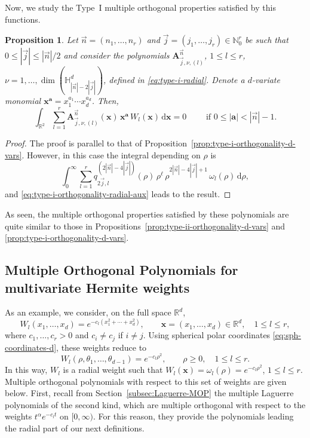 \documentclass[a4paper]{article}
\theoremstyle{plain}
\newtheorem{proposition}[theorem]{Proposition}
\theoremstyle{definition}
\newcommand{\NN}{\mathbb{N}}
\newcommand{\RR}{\mathbb{R}}
\newcommand{\dr}{\mathrm{d}}
\begin{document}
    Now, we study the Type~I multiple orthogonal properties satisfied by this functions.

    \begin{proposition} Let $\vec n = (n_1,\dots,n_r)$ and $\vec j = (j_1,\dots,j_r)\in\NN_0^r$ be such that  $0\leq |\vec j| \leq |\vec n|/2$ and consider the polynomials $\mathbf A_{\vec j,\nu,(l)}^{\vec n}$, $1\leq l\leq r$, $\nu=1,\dots,\dim(\mathbb H_{|\vec n|-2|\vec j|}^d)$, defined in \eqref{eq:type-i-radial}. Denote a $d$-variate monomial $\mathbf x^{\mathbf a}=x_1^{a_1}\cdots x_d^{a_d}$. Then,
    \begin{equation}
        \label{eq:type-ii-orthogonality-radial}
        \int_{\mathbb R^2}\sum_{l=1}^r\mathbf A_{\vec j,\nu,(l)}^{\vec n}(\mathbf x) \,\mathbf x^{\mathbf a}\, W_l(\mathbf x)\, \dr \mathbf x = 0\qquad\text{ if }0\leq|\mathbf a|<|\vec n|-1.
    \end{equation}
    \end{proposition}
    \begin{proof}
        The proof is parallel to that of Proposition~\ref{prop:type-i-orthogonality-d-vars}. However, in this case the integral depending on $\rho$ is 
        $$
        \int_{0}^\infty \sum_{l=1}^r q^{(2|\vec n|-4|\vec j|)}_{2\vec j, l}(\rho)\, \rho^\ell\,\rho^{2|\vec n|-4|\vec j|+1}\, \omega_l(\rho)\,\dr\rho,
        $$
        and \eqref{eq:type-i-orthogonality-radial-aux} leads to the result.
        
    \end{proof}

    As seen, the multiple orthogonal properties satisfied by these polynomials are quite similar to those in Propositions~\ref{prop:type-ii-orthogonality-d-vars} and \ref{prop:type-i-orthogonality-d-vars}.

    \subsection{Multiple Orthogonal Polynomials for multivariate Hermite weights}

    As an example, we consider, on the full space $\RR^d$, 
    $$
    W_l(x_1,\dots,x_d)=e^{-c_l(x_1^2+\cdots+x_d^2)}, \qquad \mathbf x =(x_1,\dots,x_d)\in\RR^d,\quad 1\leq l \leq r,
    $$
    where $c_1,\dots,c_r>0$ and $c_i\neq c_j$ if $i\neq j$. Using spherical polar coordinates \eqref{eq:sph-coordinates-d}, these weights reduce to 
    $$
    W_l(\rho, \theta_1,\dots,\theta_{d-1})=e^{-c_l \rho^2}, \qquad \rho\geq 0, \quad 1\leq l\leq r.
    $$
    In this way, $W_l$ is a radial weight such that $W_l(\mathbf x)=\omega_l(\rho)= e^{-c_l\rho^2}$, $1\leq l\leq r$. Multiple orthogonal polynomials with respect to this set of weights are given below. First, recall from Section~\ref{subsec:Laguerre-MOP} the multiple Laguerre polynomials of the second kind, which are multiple orthogonal with respect to the weights $t^\alpha e^{-c_l t}$ on $[0,\infty)$. For this reason, they provide the polynomials leading the radial part of our next definitions.
\end{document}
